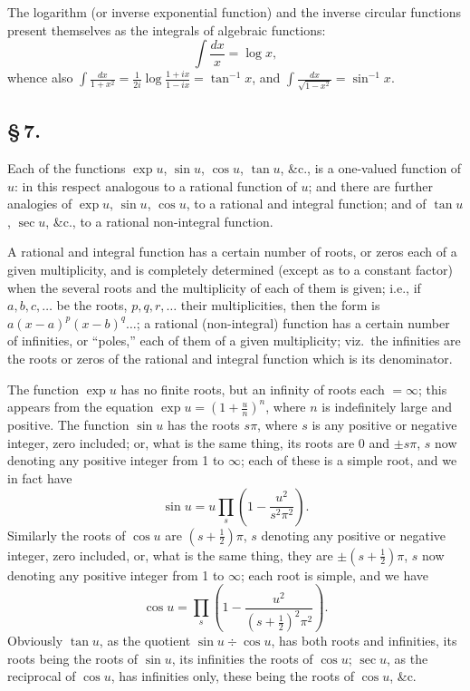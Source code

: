 \documentclass[11pt,a4paper]{article}
\begin{document}
The logarithm (or inverse exponential function) and the inverse circular functions present themselves as the integrals of algebraic functions:
\[
\int\frac{dx}{x} = \log x,
\]
whence also $\displaystyle\int\frac{dx}{1 + x^{2}} = \frac{1}{2i}\log\frac{1 + ix}{1 - ix} = \tan^{-1}x$, and $\displaystyle\int\frac{dx}{\sqrt{1 - x^{2}}} = \sin^{-1}x$.

\subsection*{\S\,7.}

Each of the functions $\exp u$, $\sin u$, $\cos u$, $\tan u$, \&c., is a one-valued function of $u$: in this respect analogous to a rational function of $u$; and there are further analogies of $\exp u$, $\sin u$, $\cos u$, to a rational and integral function; and of $\tan u$, $\sec u$, \&c., to a rational non-integral function.

A rational and integral function has a certain number of roots, or zeros each of a given multiplicity, and is completely determined (except as to a constant factor) when the several roots and the multiplicity of each of them is given; i.e., if $a, b, c, \ldots$ be the roots, $p, q, r, \ldots$ their multiplicities, then the form is $a(x - a)^{p}(x - b)^{q}\ldots$; a rational (non-integral) function has a certain number of infinities, or ``poles,'' each of them of a given multiplicity; viz.\ the infinities are the roots or zeros of the rational and integral function which is its denominator.

The function $\exp u$ has no finite roots, but an infinity of roots each $= \infty$; this appears from the equation $\exp u = \left(1 + \frac{u}{n}\right)^{n}$, where $n$ is indefinitely large and positive. The function $\sin u$ has the roots $s\pi$, where $s$ is any positive or negative integer, zero included; or, what is the same thing, its roots are $0$ and $\pm s\pi$, $s$ now denoting any positive integer from 1 to $\infty$; each of these is a simple root, and we in fact have
\[
\sin u = u\prod_{s}\left(1 - \frac{u^{2}}{s^{2}\pi^{2}}\right).
\]
Similarly the roots of $\cos u$ are $(s + \frac{1}{2})\pi$, $s$ denoting any positive or negative integer, zero included, or, what is the same thing, they are $\pm(s + \frac{1}{2})\pi$, $s$ now denoting any positive integer from 1 to $\infty$; each root is simple, and we have
\[
\cos u = \prod_{s}\left(1 - \frac{u^{2}}{(s + \frac{1}{2})^{2}\pi^{2}}\right).
\]
Obviously $\tan u$, as the quotient $\sin u \div \cos u$, has both roots and infinities, its roots being the roots of $\sin u$, its infinities the roots of $\cos u$; $\sec u$, as the reciprocal of $\cos u$, has infinities only, these being the roots of $\cos u$, \&c.
\end{document}
